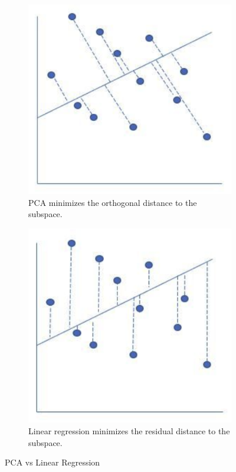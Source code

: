 \documentclass{article}
\begin{document}
    \begin{figure}[H]
      \centering
      \begin{subfigure}[b]{0.3\textwidth}
      \centering
        \includegraphics[width=\textwidth]{img/pca_ortho.png}
        \caption{PCA minimizes the orthogonal distance to the subspace. }
      \end{subfigure}
      \begin{subfigure}[b]{0.3\textwidth}
      \centering
        \includegraphics[width=\textwidth]{img/lin_reg_vert.png}
        \caption{Linear regression minimizes the residual distance to the subspace.} 
      \end{subfigure}
      \caption{PCA vs Linear Regression}
      \label{fig:pca_lin_reg}
    \end{figure}
\end{document}

